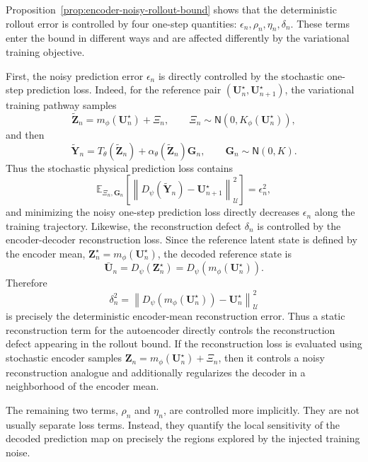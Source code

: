 \documentclass[11pt]{article}
\begin{document}
\begin{remark}
\label{rem:how-training-controls-rollout-terms}
Proposition~\ref{prop:encoder-noisy-rollout-bound} shows that the deterministic rollout error is controlled by four one-step quantities: $\epsilon_n,\rho_n,\eta_n,\delta_n.$
These terms enter the bound in different ways and are affected differently by the variational
training objective.

First, the noisy prediction error $\epsilon_n$ is directly controlled by the stochastic one-step
prediction loss. Indeed, for the reference pair
$(\mathbf U_n^\star,\mathbf U_{n+1}^\star)$, the variational training pathway samples
\[
    \widetilde{\mathbf Z}_n
    =
    m_\phi(\mathbf U_n^\star)+\Xi_n,
    \qquad
    \Xi_n\sim\mathsf N(0,K_\phi(\mathbf U_n^\star)),
\]
and then
\[
    \widetilde{\mathbf Y}_n
    =
    T_\theta(\widetilde{\mathbf Z}_n)
    +
    \alpha_\theta(\widetilde{\mathbf Z}_n)\mathbf G_n,
    \qquad
    \mathbf G_n\sim\mathsf N(0,K).
\]
Thus the stochastic physical prediction loss contains
\[
    \mathbb E_{\Xi_n,\mathbf G_n}
    \left[
    \left\|
    D_\psi(\widetilde{\mathbf Y}_n)
    -
    \mathbf U_{n+1}^\star
    \right\|_{\mathcal U}^2
    \right]
    =
    \epsilon_n^2,
\]
and minimizing the noisy one-step prediction loss directly decreases $\epsilon_n$ along the training trajectory. Likewise, the reconstruction defect $\delta_n$ is controlled by the encoder-decoder reconstruction loss. Since the reference latent state is defined by the encoder mean, $\mathbf Z_n^\star=m_\phi(\mathbf U_n^\star)$, the decoded reference state is
\[
    \bar{\mathbf U}_n
    =
    D_\psi(\mathbf Z_n^\star)
    =
    D_\psi(m_\phi(\mathbf U_n^\star)).
\]
Therefore
\[
    \delta_n^2
    =
    \left\|
    D_\psi(m_\phi(\mathbf U_n^\star))
    -
    \mathbf U_n^\star
    \right\|_{\mathcal U}^2
\]
is precisely the deterministic encoder-mean reconstruction error. Thus a static reconstruction term for the autoencoder directly controls the reconstruction defect appearing in the rollout bound. If the reconstruction loss is evaluated using stochastic encoder samples $\mathbf Z_n=m_\phi(\mathbf U_n^\star)+\Xi_n$, then it controls a noisy reconstruction analogue and additionally regularizes the decoder in a neighborhood of the encoder mean.

The remaining two terms, $\rho_n$ and $\eta_n$, are controlled more implicitly. They are not usually separate loss terms. Instead, they quantify the local sensitivity of the decoded prediction map on precisely the regions explored by the injected training noise.


\end{remark}
\end{document}
